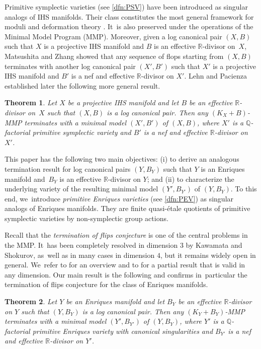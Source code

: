\documentclass[JEP,XML,SOM,Unicode,published]{cedram}
\theoremstyle{plain}
\newtheorem{thm}{Theorem}[section]
\theoremstyle{definition}
\newcommand{\Q}{\mathbb{Q}}
\newcommand{\R}{\mathbb{R}}
\begin{document}
Primitive symplectic varieties (see \autoref{dfn:PSV}) have been introduced as singular analogs of IHS manifolds. Their class constitutes the most general framework for moduli and deformation theory \cite{BL21,BL22}. It~is also preserved under the operations of the Minimal Model Program (MMP). Moreover, given a log canonical pair $(X,B)$ such that $X$ is a projective IHS manifold and $B$ is an effective $\R$\nobreakdash-divisor on~$X$, Matsushita and Zhang \cite[Th.\,4.1]{MZ13} showed that any sequence of flops starting from $(X,B)$ terminates with another log canonical pair $(X',B')$ such that $X'$ is a projective IHS manifold and $B'$ is a nef and effective $\R$\nobreakdash-divisor on $X'$. Lehn and Pacienza \cite[Th.\,1.2]{LehnPac16} established later the following more general result.

\begin{thm}
\label{thm:termination_MMP_symplectic}
Let $X$ be a projective IHS manifold and let $B$ be an effective $\R$\nobreakdash-divisor on~$X$ such that $(X,B)$ is a log canonical pair. Then any $(K_X + B)$-MMP terminates with a minimal model $(X',B')$ of $(X,B)$, where $X'$ is a $\Q$\nobreakdash-factorial primitive symplectic variety and $B'$ is a nef and effective $\R$\nobreakdash-divisor on $X'$.
\end{thm}

This paper has the following two main objectives: (i) to derive an analogous termination result for log canonical pairs $(Y,B_Y)$ such that $Y$ is an Enriques manifold and~$B_Y$ is an effective $\R$\nobreakdash-divisor on $Y$; and (ii) to characterize the underlying variety of the resulting minimal model $(Y',B_{Y'})$ of $(Y,B_Y)$. To this end, we~introduce \emph{primitive Enriques varieties} (see \autoref{dfn:PEV}) as singular analogs of Enriques manifolds. They are finite quasi-étale quotients of primitive symplectic varieties by non-symplectic group actions.

Recall that the \emph{termination of flips conjecture} is one of the central problems in the MMP. It~has been completely resolved in dimension $ 3 $ by Kawamata and Shokurov, as~well as in many cases in dimension $ 4 $, but it remains widely open in general. We~refer to \cite[\S 1]{ChenTsak23} for an overview and to \cite[Cor.\,1.4.2]{BCHM10} for a partial result that is valid in any dimension. Our main result is the following and confirms in~particular the termination of flips conjecture for the class of Enriques manifolds.

\begin{thm}
\label{thm:termination_MMP_Enriques}
Let $Y$ be an Enriques manifold and let $B_Y$ be an effective $\R$\nobreakdash-divisor on $Y$ such that $(Y,B_Y)$ is a log canonical pair. Then any $(K_Y + B_Y)$-MMP terminates with a minimal model $(Y',B_{Y'})$ of $(Y,B_Y)$, where $Y'$ is a $\Q$\nobreakdash-factorial primitive Enriques variety with canonical singularities and $B_{Y'}$ is a nef and effective $\R$\nobreakdash-divisor on $Y'$.
\end{thm}
\end{document}
